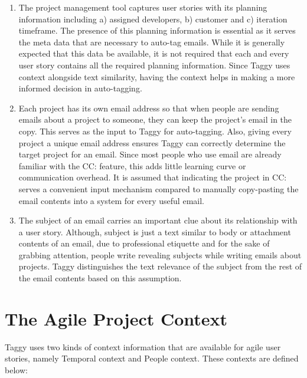 \begin{enumerate}
	\item The project management tool captures user stories with its planning information including a) assigned developers, b) customer and c) iteration timeframe. The presence of this planning information is essential as it serves the meta data that are necessary to auto-tag emails. While it is generally expected that this data be available, it is not required that each and every user story contains all the required planning information. Since Taggy uses context alongside text similarity, having the context helps in making a more informed decision in auto-tagging.
	
	\item Each project has its own email address so that when people are sending emails about a project to someone, they can keep the project's email in the copy. This serves as the input to Taggy for auto-tagging. Also, giving every project a unique email address ensures Taggy can correctly determine the target project for an email. Since most people who use email are already familiar with the CC: feature, this adds little learning curve or communication overhead. It is assumed that indicating the project in CC: serves a convenient input mechanism compared to manually copy-pasting the email contents into a system for every useful email.		
	
	\item The subject of an email carries an important clue about its relationship with a user story. Although, subject is just a text similar to body or attachment contents of an email, due to professional etiquette and for the sake of grabbing attention, people write revealing subjects while writing emails about projects. Taggy distinguishes the text relevance of the subject from the rest of the email contents based on this assumption.
\end{enumerate}



\section{The Agile Project Context}
Taggy uses two kinds of context information that are available for agile user stories, namely Temporal context and People context. These contexts are defined below:

